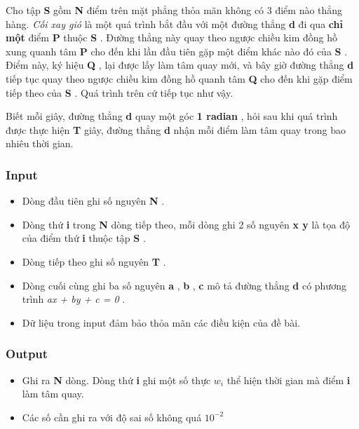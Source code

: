 



   Cho tập   \textbf{    S   }   gồm   \textbf{    N   }   điểm trên mặt phẳng thỏa mãn không có 3 điểm nào thẳng hàng.   \emph{    Cối xay gió   }   là một quá trình bắt đầu với một đường thẳng   \textbf{    d   }   đi qua   \textbf{    chỉ một   }   điểm   \textbf{    P   }   thuộc   \textbf{    S   }   . Đường thẳng này quay theo ngược chiều kim đồng hồ xung quanh tâm   \textbf{    P   }   cho đến khi lần đầu tiên gặp một điểm khác nào đó của   \textbf{    S   }   . Điểm này, ký hiệu   \textbf{    Q   }   , lại được lấy làm tâm quay mới, và bây giờ đường thẳng   \textbf{    d   }   tiếp tục quay theo ngược chiều kim đồng hồ quanh tâm   \textbf{    Q   }   cho đến khi gặp điểm tiếp theo của   \textbf{    S   }   . Quá trình trên cứ tiếp tục như vậy.  

   Biết mỗi giây, đường thẳng   \textbf{    d   }   quay một góc   \textbf{    1 radian   }   , hỏi sau khi quá trình được thực hiện   \textbf{    T   }   giây, đường thẳng   \textbf{    d   }   nhận mỗi điểm làm tâm quay trong bao nhiêu thời gian.  

\subsubsection{   Input  }
\begin{itemize}
	\item     Dòng đầu tiên ghi số nguyên    \textbf{     N    }    .   
	\item     Dòng thứ    \textbf{     i    }    trong    \textbf{     N    }    dòng tiếp theo, mỗi dòng ghi 2 số nguyên    \textbf{     x y    }    là tọa độ của điểm thứ    \textbf{     i    }    thuộc tập    \textbf{     S    }    .   
	\item     Dòng tiếp theo ghi số nguyên    \textbf{     T    }    .   
	\item     Dòng cuối cùng ghi ba số nguyên    \textbf{     a    }    ,    \textbf{     b    }    ,    \textbf{     c    }    mô tả đường thẳng    \textbf{     d    }    có phương trình    \emph{     ax + by + c = 0    }    .   
	\item     Dữ liệu trong input đảm bảo thỏa mãn các điều kiện của đề bài.   
\end{itemize}

\subsubsection{   Output  }
\begin{itemize}
	\item     Ghi ra    \textbf{     N    }    dòng. Dòng thứ    \textbf{     i    }    ghi một số thực    \textbf{     $w_{i}$}    thể hiện thời gian mà điểm    \textbf{     i    }    làm tâm quay.   
	\item     Các số cần ghi ra với độ sai số không quá $10^{-2}$
\end{itemize}

